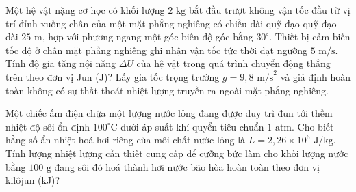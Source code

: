 \begin{ex}	Một hệ vật nặng cơ học có khối lượng $2\text{ kg}$ bắt đầu trượt không vận tốc đầu từ vị trí đỉnh xuống chân của một mặt phẳng nghiêng có chiều dài quỹ đạo quỹ đạo dài $25\text{ m}$, hợp với phương ngang một góc biên độ góc bằng $30^\circ$. Thiết bị cảm biến tốc độ ở chân mặt phẳng nghiêng ghi nhận vận tốc tức thời đạt ngưỡng $5\text{ m/s}$. Tính độ gia tăng nội năng $\Delta U$ của hệ vật trong quá trình chuyển động thẳng trên theo đơn vị Jun (J)? Lấy gia tốc trọng trường $g = 9,8\text{ m/s}^2$ và giả định hoàn toàn không có sự thất thoát nhiệt lượng truyền ra ngoài mặt phẳng nghiêng.

	\par{}
\end{ex}

\begin{ex}	Một chiếc ấm điện chứa một lượng nước lỏng đang được duy trì đun tới thềm nhiệt độ sôi ổn định $100^\circ\text{C}$ dưới áp suất khí quyển tiêu chuẩn $1\text{ atm}$. Cho biết hằng số ẩn nhiệt hoá hơi riêng của môi chất nước lỏng là $L = 2,26 \times 10^{6}\text{ J/kg}$. Tính lượng nhiệt lượng cần thiết cung cấp để cưỡng bức làm cho khối lượng nước bằng $100\text{ g}$ đang sôi đó hoá thành hơi nước bão hòa hoàn toàn theo đơn vị kilôjun (kJ)?

	\par{}
\end{ex}

